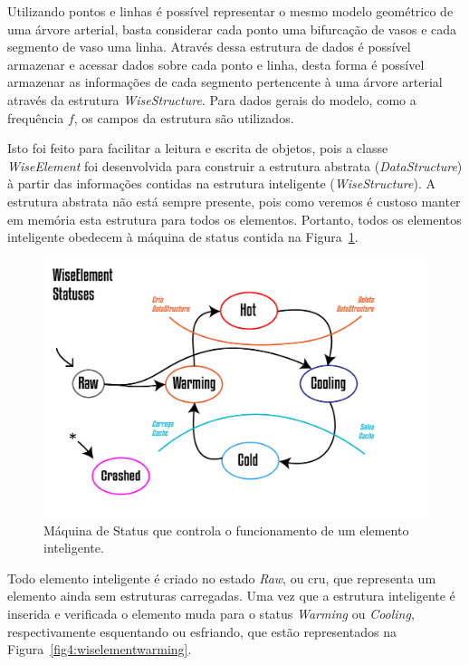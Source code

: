 \documentclass[
        english,			
        brazil			        %
        ,<...>]{abntbibufjf}
\begin{document}
Utilizando pontos e linhas é possível representar o mesmo modelo geométrico de uma árvore arterial, basta considerar cada ponto uma bifurcação de vasos e cada segmento de vaso uma linha. Através dessa estrutura de dados é possível armazenar e acessar dados sobre cada ponto e linha, desta forma é possível armazenar as informações de cada segmento pertencente à uma árvore arterial através da estrutura \textit{WiseStructure}. Para dados gerais do modelo, como a frequência $f$, os campos da estrutura são utilizados.

Isto foi feito para facilitar a leitura e escrita de objetos, pois a classe \textit{WiseElement} foi desenvolvida para construir a estrutura abstrata (\textit{DataStructure}) à partir das informações contidas na estrutura inteligente (\textit{WiseStructure}). A estrutura abstrata não está sempre presente, pois como veremos é custoso manter em memória esta estrutura para todos os elementos. Portanto, todos os elementos inteligente obedecem à máquina de status contida na Figura~\ref{fig3:wiselementstatus}.

\begin{figure}[!htbp]
	\centering
	\includegraphics[scale=1.5]{Figures/WiseElementStatus.png}
	\caption{Máquina de Status que controla o funcionamento de um elemento inteligente.}
	\label{fig3:wiselementstatus}
\end{figure}

Todo elemento inteligente é criado no estado \textit{Raw}, ou cru, que representa um elemento ainda sem estruturas carregadas. Uma vez que a estrutura inteligente é inserida e verificada o elemento muda para o status \textit{Warming} ou \textit{Cooling}, respectivamente esquentando ou esfriando, que estão representados na Figura~\ref{fig4:wiselementwarming}.
\end{document}
